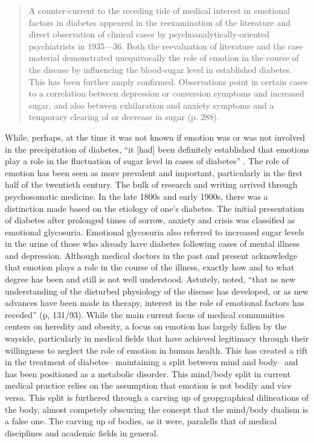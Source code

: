 \documentclass[12pt]{article}
\begin{document}
\begin{singlespace}
  \begin{quote} 
A counter-current to the receding tide of medical interest in emotional factors in diabetes appeared in the reexamination of the literature and direct observation of 
clinical cases by psychoanalytically-oriented psychiatrists in 1935—36. Both the reevaluation of literature and the case material demonstrated unequivocally the role of 
emotion in the course of the disease by influencing the blood-sugar level in established diabetes. This has been further amply confirmed. Observations point in certain cases 
to a correlation between depression or conversion symptoms and increased sugar, and also between exhilaration and anxiety symptoms and a temporary clearing of or decrease
in sugar (p. 288).\end{quote} 
    \end{singlespace}
While, perhaps, at the time it was not known if emotion was or was not involved in the precipitation of diabetes, ``it [had] been definitely established that emotions play a role in the fluctuation of sugar level in cases of diabetes'' \citep[p. 290]{daniels_1949_role}.
The role of emotion has been seen as more prevalent and important, particularly in the first half of the twentieth century. The bulk of research and writing arrived through psychosomatic medicine. In the late 1800s and early 1900s, there was a distinction made based on the etiology of one's diabetes. The initial presentation of diabetes after prolonged times of sorrow, anxiety and crisis was classified as emotional glycosuria. Emotional glycosuria also referred to increased sugar levels in the urine of those who already have diabetes following cases of mental illness and depression. Although medical doctors in the past and present acknowledge that emotion plays a role in the course of the illness, exactly how and to what degree has been and still is not well understood. Astutely, \citet{burch_1962_role} noted, ``that as new understanding of the disturbed physiology of the disease has developed, or as new advances have been made in therapy, interest in the role of emotional factors has receded'' (p, 131/93). While the main current focus of medical communities centers on heredity and obesity, a focus on emotion has largely fallen by the wayside, particularly in medical fields that have achieved legitimacy through their willingness to neglect the role of emotion in human health. This has created a rift in the treatment of diabetes-- maintaining a split between mind and body-- and has been positioned as a metabolic disorder. This mind/body split in current medical practice relies on the assumption that emotion is not bodily and vice versa. 
This split is furthered through a carving up of geopgraphical dilineations of the body, almost competely obscuring the concept that the mind/body dualism is a false one. The carving up of bodies, as it were, paralells that of medical disciplines and academic fields in general. 
\end{document}
